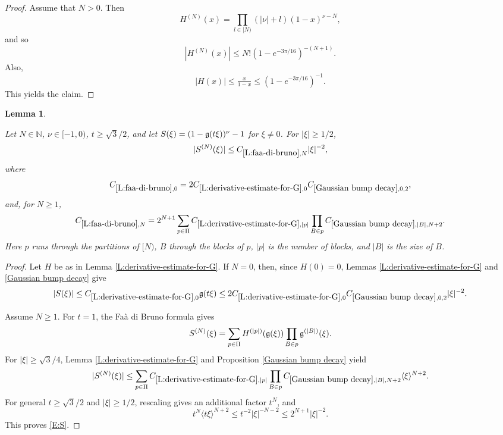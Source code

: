 \documentclass[12pt,reqno]{amsart}
\theoremstyle{plain}
\newtheorem{lemma}[theorem]{Lemma}
\numberwithin{equation}{section}
\theoremstyle{remark}
\newcommand{\uses}[1]{}
\newcommand{\usesdefs}[1]{}
\newcommand{\leanok}{}
\newcommand{\lean}[1]{}
\newcommand{\N}{{\mathbb N}}
\begin{document}
\begin{proof}
Assume that $N >0$. Then
\[
H^{(N)}(x)=\prod_{l\in [N)} (|\nu|+l)(1-x)^{\nu-N},
\]
and so
\[
|H^{(N)}(x)| \leq N! \left(1 - e^{-3\pi/16}\right)^{-(N+1)}.
\]
Also,
\[
|H(x)| \leq \tfrac{x}{1-x} \leq \left(1 - e^{-3\pi/16}\right)^{-1}.
\]
This yields the claim.
\end{proof}


\begin{lemma}\label{L:faa-di-bruno}\uses{L:derivative-estimate-for-G,Gaussian bump decay}\usesdefs{gaussian,bracket bump}
\lean{Auto.faaDiBruno}
\leanok
Let $N\in\N$, $\nu\in[-1,0)$, $t\ge\sqrt3/2$, and let $S(\xi)=(1-\mathfrak{g}(t\xi))^\nu-1$ for $\xi\ne0$. For $|\xi|\ge1/2$,
\begin{equation}\label{E:S}
|S^{(N)}(\xi)|\le C_{\ref{L:faa-di-bruno},N}|\xi|^{-2},
\end{equation}
where
\begin{equation}\label{auto:Faa-di-Bruno-zero-constant}
C_{\ref{L:faa-di-bruno},0}
=2C_{\ref{L:derivative-estimate-for-G},0}C_{\ref{Gaussian bump decay},0,2},
\end{equation}
and, for $N\ge1$,
\begin{equation}\label{auto:Faa-di-Bruno-positive-constant}
C_{\ref{L:faa-di-bruno},N}
=2^{N+1}\sum_{p\in\Pi}C_{\ref{L:derivative-estimate-for-G},|p|}
\prod_{B\in p}C_{\ref{Gaussian bump decay},|B|,N+2}.
\end{equation}
Here $p$ runs through the partitions of $[N)$, $B$ through the blocks of $p$, $|p|$ is the number of blocks, and $|B|$ is the size of $B$.
\end{lemma}
\begin{proof}
Let $H$ be as in Lemma \ref{L:derivative-estimate-for-G}. If $N=0$, then, since $H(0)=0$, Lemmas \ref{L:derivative-estimate-for-G} and \ref{Gaussian bump decay} give
\[
|S(\xi)|
\le C_{\ref{L:derivative-estimate-for-G},0}\mathfrak{g}(t\xi)
\le2C_{\ref{L:derivative-estimate-for-G},0}C_{\ref{Gaussian bump decay},0,2}|\xi|^{-2}.
\]

Assume $N\ge1$. For $t=1$, the Fa\`a di Bruno formula gives
\[
S^{(N)}(\xi)
=
\sum_{p\in\Pi}H^{(|p|)}(\mathfrak{g}(\xi))
\prod_{B\in p}\mathfrak{g}^{(|B|)}(\xi).
\]
For $|\xi|\ge\sqrt3/4$, Lemma \ref{L:derivative-estimate-for-G} and Proposition \ref{Gaussian bump decay} yield
\[
|S^{(N)}(\xi)|
\le
\sum_{p\in\Pi}C_{\ref{L:derivative-estimate-for-G},|p|}
\prod_{B\in p}C_{\ref{Gaussian bump decay},|B|,N+2}
\langle\xi\rangle^{N+2}.
\]
For general $t\ge\sqrt3/2$ and $|\xi|\ge1/2$, rescaling gives an additional factor $t^N$, and
\[
t^N\langle t\xi\rangle^{N+2}
\le t^{-2}|\xi|^{-N-2}
\le2^{N+1}|\xi|^{-2}.
\]
This proves \eqref{E:S}.
\end{proof}
\end{document}
